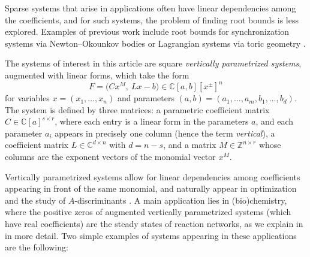 \documentclass[11pt,reqno,a4paper]{amsart}
\numberwithin{equation}{section}
\theoremstyle{theoremstyle}
\theoremstyle{examplestyle}
\newcommand{\CC}{\mathbb{C}}
\newcommand{\ZZ}{\mathbb{Z}}
\begin{document}
Sparse systems that arise in applications often have linear dependencies among the coefficients, and for such systems, the problem of finding root bounds is less explored. Examples of previous work include root bounds for synchronization systems via Newton--Okounkov bodies \cite{BBPMZ23} or Lagrangian systems via toric geometry \cite{BreidingSottileWoodcock22,LindbergMoninRose23}.

The systems of interest in this article are square \emph{vertically parametrized systems}, augmented with linear forms, which take the form
\begin{equation}
\label{eq:augmented_vertically_parametrized_intro}
    F=\big( C x^M,\: Lx-b\big)\in\CC[a,b][x^\pm]^n
\end{equation}
for variables $x=(x_1,\ldots,x_n)$ and  parameters $(a,b)=(a_1,\ldots,a_m,b_1,\ldots,b_d)$. The system is defined by three matrices: a parametric coefficient matrix $C\in\CC[a]^{s\times r}$, where each entry is a linear form in the parameters $a$, and each parameter $a_i$ appears in precisely one column (hence the term \emph{vertical}), a coefficient matrix $L\in\CC^{d\times n}$ with $d=n-s$, and a matrix $M\in\ZZ^{n\times r}$ whose columns are the exponent vectors of the monomial vector $x^M$. 

Vertically parametrized systems allow for linear dependencies among coefficients appearing in front of the same monomial, and naturally appear in optimization \cite[Example~1.1]{FeliuHenrikssonPascual2025vertical} and the study of $A$-discriminants \cite{BihanBound,FeliuFerrerTelek2025}. A main application lies in (bio)chemistry, where the positive zeros of augmented vertically parametrized systems (which have real coefficients) are the steady states of reaction networks, as we explain in  in more detail. 
Two simple examples of systems appearing in these applications are the following:
\end{document}
